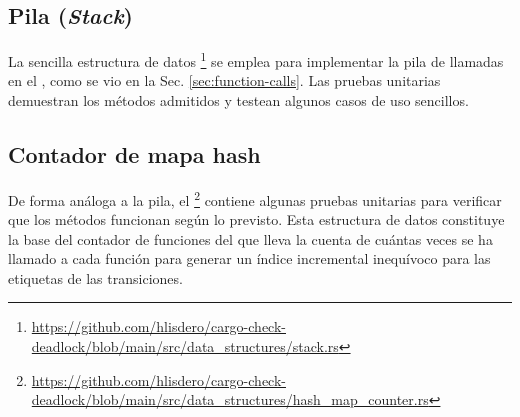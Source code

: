 \subsection{Pila (\textit{Stack})}

La sencilla estructura de datos
\footnote{\url{https://github.com/hlisdero/cargo-check-deadlock/blob/main/src/data_structures/stack.rs}}
se emplea para implementar la pila de llamadas en el , como se
vio en la Sec. \ref{sec:function-calls}.
Las pruebas unitarias demuestran los métodos admitidos y testean algunos casos de uso sencillos.

\subsection{Contador de mapa hash}

De forma análoga a la pila,
el \footnote{\url{https://github.com/hlisdero/cargo-check-deadlock/blob/main/src/data_structures/hash_map_counter.rs}}
contiene algunas pruebas unitarias para
verificar que los métodos funcionan según lo previsto.
Esta estructura de datos constituye la
base del contador de funciones del 
que lleva la cuenta de cuántas veces se ha llamado a cada función para generar un índice
incremental inequívoco para las etiquetas de las transiciones.